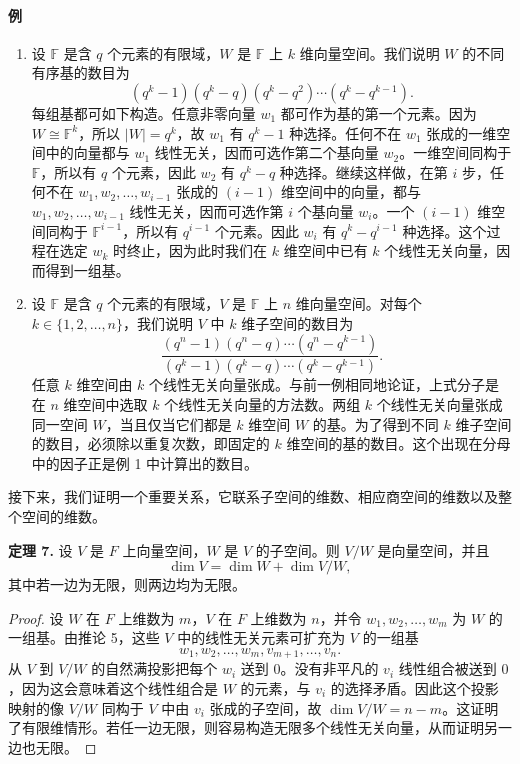 \paragraph{例}
\begin{enumerate}[label=(\arabic*)]
\item 设 $\mathbb F$ 是含 $q$ 个元素的有限域，$W$ 是 $\mathbb F$ 上 $k$ 维向量空间。我们说明 $W$ 的不同有序基的数目为
\[
(q^k-1)(q^k-q)(q^k-q^2)\cdots(q^k-q^{k-1}).
\]
每组基都可如下构造。任意非零向量 $w_1$ 都可作为基的第一个元素。因为 $W\cong\mathbb F^k$，所以 $|W|=q^k$，故 $w_1$ 有 $q^k-1$ 种选择。任何不在 $w_1$ 张成的一维空间中的向量都与 $w_1$ 线性无关，因而可选作第二个基向量 $w_2$。一维空间同构于 $\mathbb F$，所以有 $q$ 个元素，因此 $w_2$ 有 $q^k-q$ 种选择。继续这样做，在第 $i$ 步，任何不在 $w_1,w_2,\ldots,w_{i-1}$ 张成的 $(i-1)$ 维空间中的向量，都与 $w_1,w_2,\ldots,w_{i-1}$ 线性无关，因而可选作第 $i$ 个基向量 $w_i$。一个 $(i-1)$ 维空间同构于 $\mathbb F^{i-1}$，所以有 $q^{i-1}$ 个元素。因此 $w_i$ 有 $q^k-q^{i-1}$ 种选择。这个过程在选定 $w_k$ 时终止，因为此时我们在 $k$ 维空间中已有 $k$ 个线性无关向量，因而得到一组基。
\item 设 $\mathbb F$ 是含 $q$ 个元素的有限域，$V$ 是 $\mathbb F$ 上 $n$ 维向量空间。对每个 $k\in\{1,2,\ldots,n\}$，我们说明 $V$ 中 $k$ 维子空间的数目为
\[
\frac{(q^n-1)(q^n-q)\cdots(q^n-q^{k-1})}
{(q^k-1)(q^k-q)\cdots(q^k-q^{k-1})}.
\]
任意 $k$ 维空间由 $k$ 个线性无关向量张成。与前一例相同地论证，上式分子是在 $n$ 维空间中选取 $k$ 个线性无关向量的方法数。两组 $k$ 个线性无关向量张成同一空间 $W$，当且仅当它们都是 $k$ 维空间 $W$ 的基。为了得到不同 $k$ 维子空间的数目，必须除以重复次数，即固定的 $k$ 维空间的基的数目。这个出现在分母中的因子正是例 1 中计算出的数目。
\end{enumerate}

接下来，我们证明一个重要关系，它联系子空间的维数、相应商空间的维数以及整个空间的维数。

\noindent\textbf{定理 7.} 设 $V$ 是 $F$ 上向量空间，$W$ 是 $V$ 的子空间。则 $V/W$ 是向量空间，并且
\[
\dim V=\dim W+\dim V/W,
\]
其中若一边为无限，则两边均为无限。

\begin{proof}
设 $W$ 在 $F$ 上维数为 $m$，$V$ 在 $F$ 上维数为 $n$，并令 $w_1,w_2,\ldots,w_m$ 为 $W$ 的一组基。由推论 5，这些 $V$ 中的线性无关元素可扩充为 $V$ 的一组基
\[
w_1,w_2,\ldots,w_m,v_{m+1},\ldots,v_n.
\]
从 $V$ 到 $V/W$ 的自然满投影把每个 $w_i$ 送到 $0$。没有非平凡的 $v_i$ 线性组合被送到 $0$，因为这会意味着这个线性组合是 $W$ 的元素，与 $v_i$ 的选择矛盾。因此这个投影映射的像 $V/W$ 同构于 $V$ 中由 $v_i$ 张成的子空间，故 $\dim V/W=n-m$。这证明了有限维情形。若任一边无限，则容易构造无限多个线性无关向量，从而证明另一边也无限。
\end{proof}

